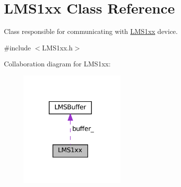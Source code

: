 \hypertarget{classLMS1xx}{}\section{L\+M\+S1xx Class Reference}
\label{classLMS1xx}


Class responsible for communicating with \hyperlink{classLMS1xx}{L\+M\+S1xx} device.  




{\ttfamily \#include $<$L\+M\+S1xx.\+h$>$}



Collaboration diagram for L\+M\+S1xx\+:
\nopagebreak
\begin{figure}[H]
\begin{center}
\leavevmode
\includegraphics[width=150pt]{classLMS1xx__coll__graph}
\end{center}
\end{figure}
